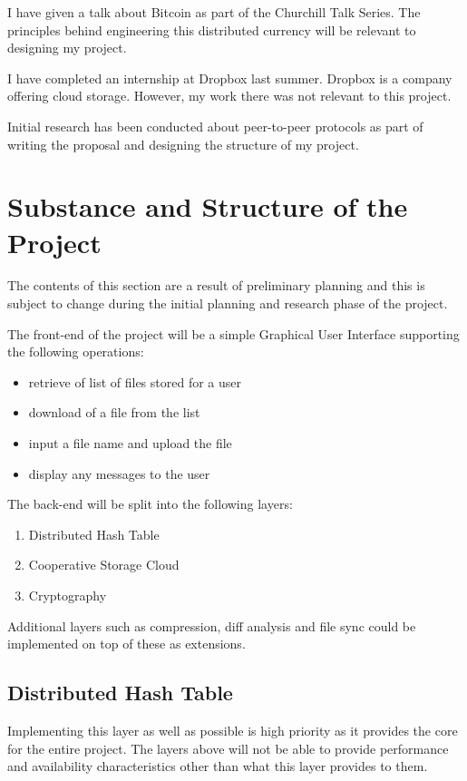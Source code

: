 \documentclass[12pt]{article}
\begin{document}
I have given a talk about Bitcoin as part of the Churchill Talk Series. The principles behind engineering this distributed currency will be relevant to designing my project.

I have completed an internship at Dropbox last summer. Dropbox is a company offering cloud storage. However, my work there was not relevant to this project.

Initial research has been conducted about peer-to-peer protocols as part of writing the proposal and designing the structure of my project.

\section{Substance and Structure of the Project}

The contents of this section are a result of preliminary planning and this is subject to change during the initial planning and research phase of the project.

The front-end of the project will be a simple Graphical User Interface supporting the following operations:

\begin{itemize}
\item{retrieve of list of files stored for a user}
\item{download of a file from the list}
\item{input a file name and upload the file}
\item{display any messages to the user}
\end{itemize}

The back-end will be split into the following layers:

\begin{enumerate}
\item{Distributed Hash Table}
\item{Cooperative Storage Cloud}
\item{Cryptography}
\end{enumerate}

Additional layers such as compression, diff analysis and file sync could be implemented on top of these as extensions.

\subsection{Distributed Hash Table}
Implementing this layer as well as possible is high priority as it provides the core for the entire project. The layers above will not be able to provide performance and availability characteristics other than what this layer provides to them.
\end{document}
